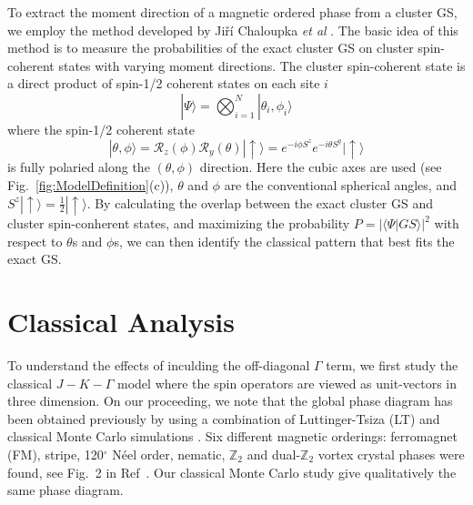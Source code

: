 \documentclass[aps,prb,reprint,amsfonts,amsmath,amssymb,showpacs,groupedaddress,superscriptaddress]{revtex4-1}
\begin{document}
To extract the moment direction of a magnetic ordered phase from a cluster GS, we employ the method developed by Ji\v{r}\'{i} Chaloupka \emph{et  al} \cite{PhysRevB.94.064435}. The basic idea of this method is to measure the probabilities of the exact cluster GS on cluster spin-coherent states with varying moment directions. The cluster spin-coherent state is a direct product of spin-1/2 coherent states on each site $i$
\begin{equation}
    | \Psi \rangle = \bigotimes_{i=1}^N | \theta_i, \phi_i \rangle \label{eq:ClusterCoherentState}
\end{equation}
where the spin-1/2 coherent state
\begin{equation}
    | \theta, \phi \rangle = \mathcal{R}_z(\phi) \mathcal{R}_y(\theta) | \uparrow \rangle = e^{-i \phi S^z} e^{-i \theta S^y} | \uparrow \rangle \label{eq:Spin-1/2CoherentState}
\end{equation}
is fully polaried along the $(\theta, \phi)$ direction. Here the cubic axes are used (see Fig.~\ref{fig:ModelDefinition}(c)), $\theta$ and $\phi$ are the conventional spherical angles, and $S^z | \uparrow \rangle = \frac{1}{2} | \uparrow \rangle$. By calculating the overlap between the exact cluster GS and cluster spin-conherent states, and maximizing the probability $P = | \langle \Psi | GS \rangle|^2$ with respect to $\theta$s and $\phi$s, we can then identify the classical pattern that best fits the exact GS.

\section{\label{sec:SectionIII}Classical Analysis}
To understand the effects of inculding the off-diagonal $\Gamma$ term, we first study the classical $J-K-\Gamma$ model where the spin operators are viewed as unit-vectors in three dimension. On our proceeding, we note that the global phase diagram has been obtained previously by using a combination of Luttinger-Tsiza (LT) and classical Monte Carlo simulations \cite{PhysRevB.92.165108}. Six different magnetic orderings: ferromagnet (FM), stripe, 120$^\circ$ N\'{e}el order, nematic, $\mathbb{Z}_2$ and dual-$\mathbb{Z}_2$ vortex crystal phases were found, see Fig.~2 in Ref~. Our classical Monte Carlo study give qualitatively the same phase diagram.
\end{document}
